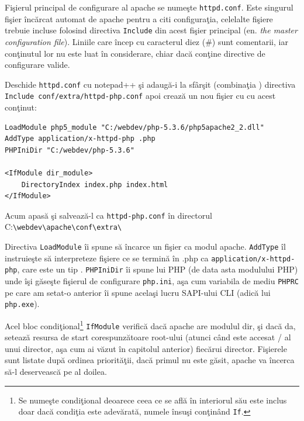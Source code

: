 Fişierul principal de configurare  al apache se numeşte \texttt{httpd.conf}. Este singurul
fişier încărcat automat de apache pentru a citi configuraţia, celelalte fişiere
trebuie incluse folosind directiva \texttt{Include} din acest fişier
principal (en. \textsl{the master configuration file}). Liniile care încep
cu caracterul diez (\#) sunt comentarii, iar conţinutul lor nu este luat
în considerare, chiar dacă conţine directive de configurare valide.

Deschide \texttt{httpd.conf} cu notepad++ şi adaugă-i la sfârşit
(combinaţia ) directiva
\texttt{Include conf/extra/httpd-php.conf}
apoi crează un nou fişier cu  cu acest conţinut:
\begin{verbatim}
LoadModule php5_module "C:/webdev/php-5.3.6/php5apache2_2.dll"
AddType application/x-httpd-php .php
PHPIniDir "C:/webdev/php-5.3.6"

<IfModule dir_module>
    DirectoryIndex index.php index.html
</IfModule>
\end{verbatim}

Acum apasă  şi salvează-l ca \texttt{httpd-php.conf}
în directorul
C:\texttt{{\textbackslash}webdev{\textbackslash}apache{\textbackslash}conf{\textbackslash}extra{\textbackslash}}

Directiva \texttt{LoadModule} îi spune să încarce un fişier ca modul apache. \texttt{AddType}
îl instruieşte să interpreteze fişiere ce se termină în .php ca 
\texttt{application/x-httpd-php}, care este un tip 
.
\texttt{PHPIniDir} îi spune lui PHP (de data asta modulului PHP) unde îşi găseşte fişierul
de configurare \texttt{php.ini}, aşa cum variabila de mediu \texttt{PHPRC} pe care
am setat-o anterior îi spune acelaşi lucru SAPI-ului CLI (adică lui \texttt{php.exe}).

Acel bloc condiţional\footnote{Se numeşte condiţional deoarece ceea ce se află
în interiorul său este inclus doar dacă condiţia este adevărată, numele însuşi
conţinând \texttt{If}.}
 \texttt{IfModule} verifică dacă apache are modulul {\glqq}dir{\grqq}, şi dacă
da, setează resursa de start corespunzătoare root-ului (atunci când este accesat {\glqq}/{\grqq}
al unui director, aşa cum ai văzut în capitolul anterior) fiecărui director. Fişierele
sunt listate după ordinea priorităţii, dacă primul nu este găsit, apache va încerca să-l
deservească pe al doilea.

